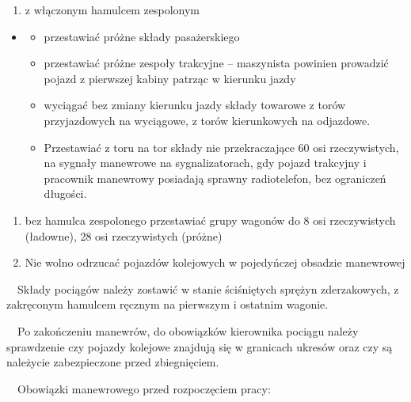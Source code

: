 \begin{enumerate}
\item z włączonym hamulcem zespolonym
\end{enumerate}
\begin{itemize}
\item \begin{itemize}
\item przestawiać próżne składy pasażerskiego
\item przestawiać próżne zespoły trakcyjne – maszynista powinien prowadzić pojazd z pierwszej kabiny patrząc w kierunku
jazdy
\item wyciągać bez zmiany kierunku jazdy składy towarowe z torów przyjazdowych na wyciągowe, z torów kierunkowych na
odjazdowe.
\item Przestawiać z toru na tor składy nie przekraczające 60 osi rzeczywistych, na sygnały manewrowe na sygnalizatorach,
gdy pojazd trakcyjny i pracownik manewrowy posiadają sprawny radiotelefon, bez ograniczeń długości.
\end{itemize}
\end{itemize}
\begin{enumerate}
\item bez hamulca zespolonego przestawiać grupy wagonów do 8 osi rzeczywistych (ładowne), 28  osi rzeczywistych (próżne)
\item Nie wolno odrzucać pojazdów kolejowych w pojedyńczej obsadzie manewrowej
\end{enumerate}
\ \ Składy pociągów należy zostawić w stanie ściśniętych sprężyn zderzakowych, z zakręconym hamulcem ręcznym na
pierwszym i ostatnim wagonie.

\ \ Po zakończeniu manewrów, do obowiązków kierownika pociągu należy sprawdzenie czy pojazdy kolejowe znajdują się w
granicach ukresów oraz czy są należycie zabezpieczone przed zbiegnięciem.

\ \ Obowiązki manewrowego przed rozpoczęciem pracy:

